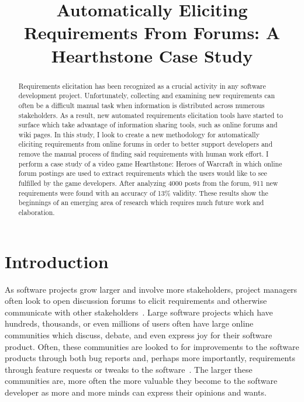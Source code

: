 \documentclass[conference]{IEEEtran}
\begin{document}
\title{Automatically Eliciting Requirements From Forums: A Hearthstone Case Study}

\author{
}

\maketitle


\begin{abstract}
Requirements elicitation has been recognized as a crucial activity in any software development project.
Unfortunately, collecting and examining new requirements can often be a difficult manual task when
information is distributed across numerous stakeholders. As a result, new automated requirements elicitation tools
have started to surface which take advantage of information sharing tools, such as online forums and wiki pages.
In this study, I look to create a new methodology for automatically eliciting requirements from online forums in
order to better support developers and remove the manual process of finding said requirements with human work effort.
I perform a case study of a video game Hearthstone: Heroes of Warcraft in which online forum postings are used to
extract requirements which the users would like to see fulfilled by the game developers. After analyzing 4000 posts
from the forum, 911 new requirements were found with an accuracy of 13\% validity. These results show the beginnings
of an emerging area of research which requires much future work and elaboration.
\end{abstract}


\section{Introduction}

As software projects grow larger and involve more
stakeholders, project managers often look to open discussion forums to elicit requirements
and otherwise communicate with other stakeholders~\cite{Wanner:2011:FEU}.
Large software projects which have hundreds, thousands, or even millions of users
often have large online communities which discuss, debate, and even express joy
for their software product. Often, these communities are looked to for improvements
to the software products through both bug reports and, perhaps more importantly, requirements
through feature requests or tweaks to the software~\cite{Shin}. The larger these communities are, more
often the more valuable they become to the software developer as more and more minds can express
their opinions and wants.
\end{document}
